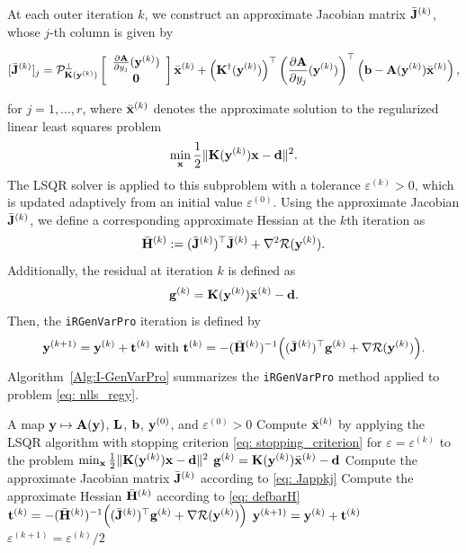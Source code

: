 \documentclass[onefignum,onetabnum]{siamart171218}
\newcommand{\bA}{{\bf A}}
\newcommand{\bH}{{\bf H}}
\newcommand{\bJ}{{\bf J}}
\newcommand{\bK}{{\bf K}}
\newcommand{\bL}{{\bf L}}
\newcommand{\bb}{{\bf b}}
\newcommand{\bd}{{\bf d}}
\newcommand{\bg}{{\bf g}}
\newcommand{\bt}{{\bf t}}
\newcommand{\bx}{{\bf x}}
\newcommand{\by}{{\bf y}}
\begin{document}
At each outer iteration $k$, we construct an approximate Jacobian matrix $\bar{\bJ}^{(k)}$, whose $j$-th column is given by
\begin{small}
\begin{equation}\label{eq: Jappkj}
 [\bar\bJ^{(k)}]_j = \mathcal{P}^\perp_{\bK(\by^{(k)})} \left[ \begin{array}{c} \frac{\partial \bA}{\partial y_j}(\by^{(k)}) \\ \bf{0} \end{array} \right] \bar{\bx}^{(k)} + \left(\bK^\dagger(\by^{(k)})\right)^\top \left(\frac{\partial \bA}{\partial y_j}(\by^{(k)})\right)^\top \left(\bb - \bA(\by^{(k)}) \bar{\bx}^{(k)}\right),
\end{equation}
\end{small}
for $j = 1, \dots, r$, where $\bar{\bx}^{(k)}$ denotes the approximate solution to the regularized linear least squares problem
\[
\min_{\bx} \frac{1}{2}\|\bK(\by^{(k)})\bx - \bd\|^2.
\]
The LSQR solver is applied to this subproblem with a tolerance $\varepsilon^{(k)} > 0$, which is updated adaptively from an initial value $\varepsilon^{(0)}$. Using the approximate Jacobian $\bar{\bJ}^{(k)}$, we define a corresponding approximate Hessian at the $k$th iteration as
\begin{equation}\label{eq: defbarH}
\bar{\bH}^{(k)} := (\bar{\bJ}^{(k)})^\top \bar{\bJ}^{(k)} + \nabla^2 \mathcal{R}(\by^{(k)}).
\end{equation}
Additionally, the residual at iteration $k$ is defined as
\[
\bg^{(k)} = \bK(\by^{(k)}) \bar{\bx}^{(k)} - \bd.
\]
Then, the \texttt{iRGenVarPro} iteration is defined by 
\begin{equation}\label{eq: iGenVarPro}
\by^{(k+1)}=\by^{(k)} + \bt^{(k)} \mbox{ with } \bt^{(k)}= -(\bar{\bH}^{(k)})^{-1} \Big((\bar{\bJ}^{(k)})^\top \bg^{(k)}+ \nabla\mathcal{R}(\by^{(k)})\Big).
\end{equation}
Algorithm~\ref{Alg:I-GenVarPro} summarizes the \texttt{iRGenVarPro} method applied to problem \eqref{eq: nlls_regy}.

\begin{algorithm}[ht]
\caption{\texttt{iRGenVarPro}}
\label{Alg:I-GenVarPro}
\begin{algorithmic}[1]
 A map $\by \mapsto \bA(\by)$, $\bL$, $\bb$, $\by^{(0)}$, and $\varepsilon^{(0)}>0$
    \STATE Compute $\bar \bx^{(k)}$ by applying the LSQR algorithm with stopping criterion \eqref{eq: stopping_criterion} for $\varepsilon=\varepsilon^{(k)}$ to the problem 
    $\min_{\bx} \frac{1}{2}\|\bK(\by^{(k)})\bx - \bd\|^2$ 
    \STATE $\bg^{(k)} = \bK(\by^{(k)})\bar \bx^{(k)}-\bd$\;
    \STATE Compute the approximate Jacobian matrix $\bar\bJ^{(k)}$ according to \eqref{eq: Jappkj}\;
    \STATE Compute the approximate Hessian $\bar{\bH}^{(k)}$ according to \eqref{eq: defbarH}\;
    \STATE $\bt^{(k)}=  -(\bar{\bH}^{(k)})^{-1} \Big((\bar{\bJ}^{(k)})^\top \bg^{(k)}+ \nabla\mathcal{R}(\by^{(k)})\Big)$\;
    \STATE $\by^{(k+1)} = \by^{(k)} + \bt^{(k)}$\;
    \STATE $\varepsilon^{(k+1)} = \varepsilon^{(k)}/2$\;
\ENDFOR    
\end{algorithmic}
\end{algorithm}
\end{document}
